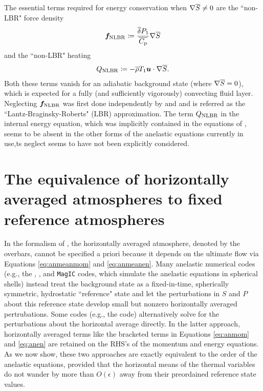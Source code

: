\documentclass[12pt]{article}
\begin{document}
The essential terms required for energy conservation when $\nabla\overline{S}\neq0$ are the ``non-LBR" force density
\begin{align}\label{eq:nlbrmom}
	\bm{f}_{\rm NLBR} \coloneqq \frac{\overline{\delta} P_1}{\overline{C_{\rm{p}}}} \nabla\overline{S}
\end{align}
and the ``non-LBR" heating
\begin{align}\label{eq:nlbrheat}
	Q_{\rm NLBR} \coloneqq -\overline{\rho} T_1\bm{u}\cdot\nabla\overline{S}.
\end{align}
Both these terms vanish for an adiabatic background state (where $\nabla\overline{S}=0$), which is expected for a fully (and sufficiently vigorously) convecting fluid layer.  Neglecting $\bm{f}_{\rm NLBR}$ was first done independently by \citet{Lantz1992} and \citet{Braginsky1995} and is referred as the ``Lantz-Braginsky-Roberts" (LBR) approximation. The term $Q_{\rm NLBR}$ in the internal energy equation, which was implicitly contained in the equations of \citet{Gough1969}, seems to be absent in the other forms of the anelastic equations currently in use,ts neglect seems to have not been explicitly considered. 

\section{The equivalence of horizontally averaged atmospheres to fixed reference atmospheres}
In the formalism of \citet{Gough1969}, the horizontally averaged atmosphere, denoted by the overbars, cannot be specified a priori because it depends on the ultimate flow via Equations \eqref{eq:anmeanmom} and \eqref{eq:anmeanen}. Many anelastic numerical codes (e.g., the {\rayleigh}, {\eulag}, and \texttt{MagIC} codes, which simulate the anelastic equations in spherical shells) instead treat the background state as a fixed-in-time, spherically symmetric, hydrostatic ``reference" state and let the perturbations in $S$ and $P$ about this reference state develop small but nonzero horizontally averaged pertrubations. Some codes (e.g., the {\ash} code) alternatively solve for the perturbations about the horizontal average directly. In the latter approach, horizontally averaged terms like the bracketed terms in Equations \eqref{eq:anmom} and \eqref{eq:anen} are retained on the RHS's of the momentum and energy equations. As we now show, these two approaches are exactly equivalent to the order of the anelastic equations, provided that the horizontal means of the thermal variables do not wander by more than $O(\epsilon)$ away from their preordained reference state values. 
\end{document}
